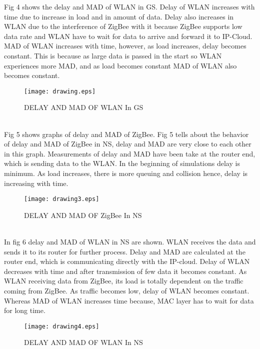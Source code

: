 \documentclass[11pt, conference, compsocconf, onecolumn]{IEEEtran}
\begin{document}
\indent Fig 4 shows the delay and MAD of WLAN in GS. Delay of WLAN increases with time due to increase in load and in amount of data. Delay also increases in WLAN due to the interference of ZigBee with it because ZigBee supports low data rate and WLAN have to wait for data to arrive and forward it to IP-Cloud. MAD of WLAN increases with time, however, as load increases, delay becomes constant. This is because as large data is passed in the start so WLAN experiences more MAD, and as load becomes constant MAD of WLAN also becomes constant.
\begin{figure}[!b]
\centering
\caption{DELAY AND MAD OF WLAN In GS}
\texttt{[image: drawing.eps]}
\end{figure}
\\
\indent Fig 5 shows graphs of delay and MAD of ZigBee. Fig 5 tells about the behavior of delay and MAD of ZigBee in NS, delay and MAD are
very close to each other in this graph. Measurements of delay and MAD have been take at the router end, which is sending data to the WLAN. In the beginning
of simulations delay is minimum. As load increases, there is more queuing and collision hence, delay is increasing with time.
\begin{figure}[!b]
\centering
\caption{DELAY AND MAD OF ZigBee In NS}
\texttt{[image: drawing3.eps]}
\end{figure}
\\
\indent In fig 6 delay and MAD of WLAN in NS are shown. WLAN receives the data and sends it to its router for further process. Delay and MAD are calculated at the router end, which is communicating directly with the IP-cloud. Delay of WLAN decreases with time and after transmission of few data it becomes constant. As WLAN receiving data from ZigBee, its load is totally dependent on the traffic coming from ZigBee. As traffic becomes low, delay of WLAN becomes constant. Whereas MAD of WLAN increases time because, MAC layer has to wait for data for long time.
\begin{figure}[!h]
\centering
\caption{DELAY AND MAD OF WLAN In NS}
\texttt{[image: drawing4.eps]}
\end{figure}
\end{document}
